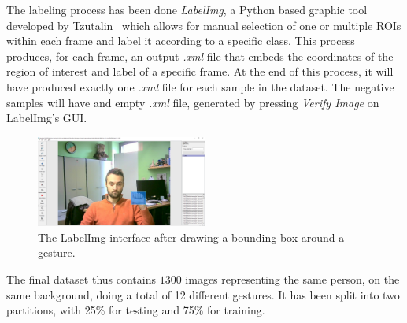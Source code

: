 \documentclass[10pt,twocolumn,letterpaper]{article}
\begin{document}
\begin{flushleft}
The labeling process has been done \textit{LabelImg}, a Python based graphic tool developed by Tzutalin~\cite{tzutalin2015labelimg} which allows for manual selection of one or multiple ROIs within each frame and label it according to a specific class.
This process produces, for each frame, an output \textit{.xml} file that embeds the coordinates of the region of interest and label of a specific frame. At the end of this process, it will have produced exactly one \textit{.xml} file for each sample in the dataset. The negative samples will have and empty \textit{.xml} file, generated by pressing \textit{Verify Image} on LabelImg's GUI.\linebreak

\begin{figure}[!h]
    \centering
    \includegraphics[width=0.5\textwidth]{resources/image/labelImgScreenshot.PNG} \caption{The LabelImg interface after drawing a bounding box around a gesture.}
\end{figure}

The final dataset thus contains $1300$ images representing the same person, on the same background, doing a total of 12 different gestures. It has been split into two partitions, with 25\% for testing and 75\% for training.
\end{flushleft}
\end{document}
